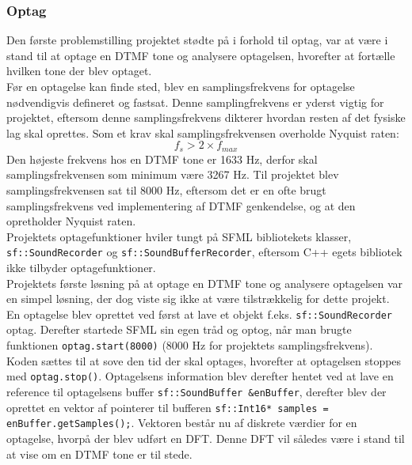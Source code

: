 \subsubsection{Optag}
Den første problemstilling projektet stødte på i forhold til optag, var at være i stand til at optage en DTMF tone og analysere optagelsen, hvorefter at fortælle hvilken tone der blev optaget.
\\
\newline
Før en optagelse kan finde sted, blev en samplingsfrekvens for optagelse nødvendigvis defineret og fastsat. Denne samplingfrekvens er yderst vigtig for projektet, eftersom denne samplingsfrekvens dikterer hvordan resten af det fysiske lag skal oprettes. 
\newline
Som et krav skal samplingsfrekvensen overholde Nyquist raten:
$$f_s > 2 \times f_{max}$$
\newline
Den højeste frekvens hos en DTMF tone er 1633 Hz, derfor skal samplingsfrekvensen som minimum være 3267 Hz. Til projektet blev samplingsfrekvensen sat til 8000 Hz, eftersom det er en ofte brugt samplingsfrekvens ved implementering af DTMF genkendelse, og at den opretholder Nyquist raten.
\\
\newline
Projektets optagefunktioner hviler tungt på SFML bibliotekets klasser, \texttt{sf::\textcolor{dkgreen}{SoundRecorder}} og \texttt{sf::\textcolor{dkgreen}{SoundBufferRecorder}}, eftersom C++ egets bibliotek ikke tilbyder optagefunktioner.
\\
\newline
Projektets første løsning på at optage en DTMF tone og analysere optagelsen var en simpel løsning, der dog viste sig ikke at være tilstrækkelig for dette projekt.
\newline
En optagelse blev oprettet ved først at lave et objekt f.eks. \texttt{sf::\textcolor{dkgreen}{SoundRecorder}} optag.
\newline
Derefter startede SFML sin egen tråd og optog, når man brugte funktionen \texttt{optag.start(8000)} (8000 Hz for projektets samplingsfrekvens). Koden sættes til at sove den tid der skal optages, hvorefter at optagelsen stoppes med \texttt{optag.stop()}. Optagelsens information blev derefter hentet ved at lave en reference til optagelsens buffer \texttt{sf::\textcolor{dkgreen}{SoundBuffer} \&enBuffer}, derefter blev der oprettet en vektor af pointerer til bufferen \texttt{sf::\textcolor{dkgreen}{Int16*} samples = enBuffer.getSamples();}. Vektoren består nu af diskrete værdier for en optagelse, hvorpå der blev udført en DFT. Denne DFT vil således være i stand til at vise om en DTMF tone er til stede.
